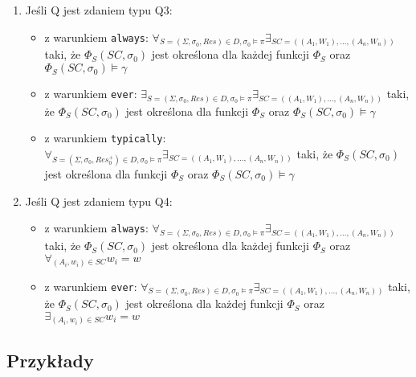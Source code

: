 \documentclass{article}
\begin{document}
\begin{enumerate}
	\item Jeśli Q jest zdaniem typu Q3:
	\begin{itemize}
		\item z warunkiem \texttt{always}: 
		$\forall_{S=(\Sigma, \sigma_{0}, Res) \in D, \sigma_{0} \models \pi} \exists_{SC=((A_{1}, W_{1}), \dots, (A_{n}, W_{n}))}$ taki, że $\Phi_{S}(SC, \sigma_{0})$ jest określona dla każdej funkcji $\Phi_{S}$ oraz $\Phi_{S}(SC, \sigma_{0}) \models \gamma$
		\item z warunkiem \texttt{ever}:
		$\exists_{S=(\Sigma, \sigma_{0}, Res) \in D, \sigma_{0} \models \pi} \exists_{SC=((A_{1}, W_{1}), \dots, (A_{n}, W_{n}))}$ taki, że $\Phi_{S}(SC, \sigma_{0})$ jest określona dla funkcji $\Phi_{S}$ oraz $\Phi_{S}(SC, \sigma_{0}) \models \gamma$
		\item z warunkiem \texttt{typically}:
		$\forall_{S=(\Sigma, \sigma_{0}, Res_{0}^{+}) \in D, \sigma_{0} \models \pi} \exists_{SC=((A_{1}, W_{1}), \dots, (A_{n}, W_{n}))}$ taki, że $\Phi_{S}(SC, \sigma_{0})$ jest określona dla funkcji $\Phi_{S}$ oraz $\Phi_{S}(SC, \sigma_{0}) \models \gamma$
	\end{itemize}
	\item Jeśli Q jest zdaniem typu Q4:
	\begin{itemize}
		\item z warunkiem \texttt{always}: 
		$\forall_{S=(\Sigma, \sigma_{0}, Res) \in D, \sigma_{0} \models \pi} \exists_{SC=((A_{1}, W_{1}), \dots, (A_{n}, W_{n}))}$ taki, że $\Phi_{S}(SC, \sigma_{0})$ jest określona dla każdej funkcji $\Phi_{S}$ oraz $\forall_{(A_{i}, w_{i}) \in SC}w_{i} = w$
		\item z warunkiem \texttt{ever}:
		$\forall_{S=(\Sigma, \sigma_{0}, Res) \in D, \sigma_{0} \models \pi} \exists_{SC=((A_{1}, W_{1}), \dots, (A_{n}, W_{n}))}$ taki, że $\Phi_{S}(SC, \sigma_{0})$ jest określona dla każdej funkcji $\Phi_{S}$ oraz $\exists_{(A_{i}, w_{i}) \in SC}w_{i} = w$
	\end{itemize}
\end{enumerate} 


\subsection{Przykłady}
\end{document}
